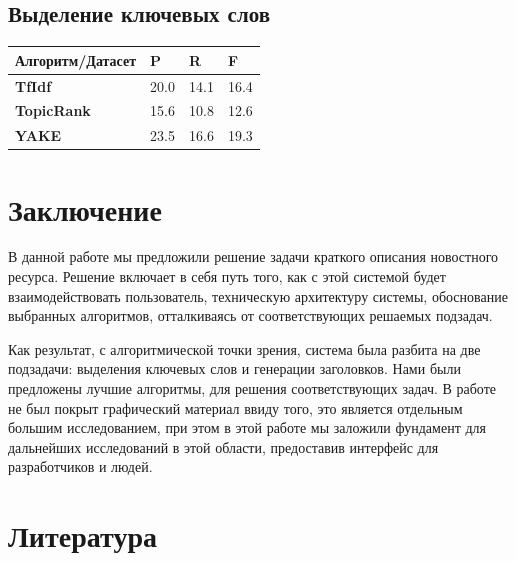 \documentclass[aps,%
12pt,%
final,%
oneside,
onecolumn,%
musixtex, %
superscriptaddress,%
centertags]{article} %
\begin{document}
\subsection{Выделение ключевых слов}



\begin{table}[ht]
\begin{tabular}{|l|l|l|l|}
\hline
\textbf{Алгоритм/Датасет} & P & R & F \\ \hline
\textbf{TfIdf} & 20.0 & 14.1 & 16.4 \\ \hline
\textbf{TopicRank} & 15.6 & 10.8 & 12.6 \\ \hline
\textbf{YAKE} & 23.5 & 16.6 & 19.3 \\ \hline
\end{tabular}
\end{table}

\section{Заключение}

В данной работе мы предложили решение задачи краткого описания новостного ресурса. Решение включает в себя путь того, как с этой системой будет взаимодействовать пользователь, техническую архитектуру системы, обоснование выбранных алгоритмов, отталкиваясь от соответствующих решаемых подзадач.

Как результат, с алгоритмической точки зрения, система была разбита на две подзадачи: выделения ключевых слов и генерации заголовков. Нами были предложены лучшие алгоритмы, для решения соответствующих задач. В работе не был покрыт графический материал ввиду того, это является отдельным большим исследованием, при этом в этой работе мы заложили фундамент для дальнейших исследований в этой области, предоставив интерфейс для разработчиков и людей.

\section{Литература}



\end{document}
